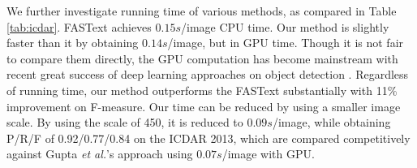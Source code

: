 \documentclass[runningheads]{llncs}
\begin{document}


 We further investigate running time of various  methods, as compared in Table \ref{tab:icdar}. FASText \cite{Busta2015} achieves $0.15s$/image CPU time. Our method is slightly faster than it by obtaining $0.14s$/image, but in GPU time. Though it is not fair to  compare them directly, the GPU computation has become mainstream with recent great success of deep learning approaches on object detection \cite{Ren2015,Girshick2015,Girshick2014}. Regardless of running time, our method outperforms the FASText substantially with 11\% improvement on F-measure. Our time can be reduced by using a smaller image scale. By using the scale of 450, it is reduced to $0.09s$/image, while obtaining P/R/F of 0.92/0.77/0.84 on the ICDAR 2013, which are compared competitively against Gupta \textit{et al.}'s approach \cite{Gupta2016} using $0.07s$/image with GPU.
 

\end{document}
